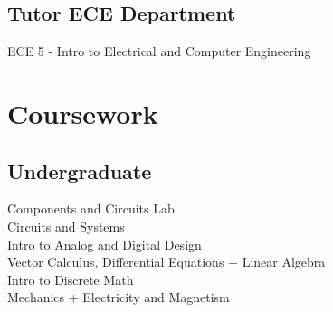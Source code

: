 \documentclass[]{deedy-resume-openfont}
\begin{document}
\begin{minipage}[t]{0.31\textwidth}
\subsection{Tutor ECE Department}
ECE 5 - Intro to Electrical and Computer Engineering
\sectionsep


\section{Coursework}

\subsection{Undergraduate}
\textbullet Components and Circuits Lab \\
\textbullet Circuits and Systems \\
\textbullet Intro to Analog and Digital Design \\
\textbullet Vector Calculus, Differential Equations + Linear Algebra \\
\textbullet Intro to Discrete Math \\
\textbullet Mechanics + Electricity and Magnetism\\
\sectionsep


%
%

\end{minipage} 
\hfill
\end{document}
